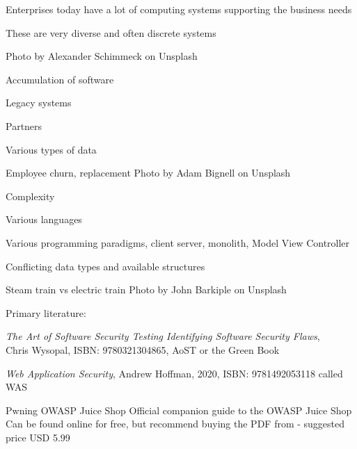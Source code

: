 \documentclass[Screen16to9,17pt]{foils}
\begin{document}
\begin{list2}
\item Enterprises today have a lot of computing systems supporting the business needs
\item These are very diverse and often discrete systems
\end{list2}

\hfill Photo by Alexander Schimmeck on Unsplash



\begin{list2}
\item Accumulation of software
\item Legacy systems
\item Partners
\item Various types of data
\item Employee churn, replacement \hfill Photo by Adam Bignell on Unsplash
\end{list2}




\begin{list2}
\item Complexity
\item Various languages
\item Various programming paradigms, client server, monolith, Model View Controller
\item Conflicting data types and available structures
\item Steam train vs electric train \hfill Photo by John Barkiple on Unsplash

\end{list2}



Primary literature:
\begin{list2}
\item \emph{The Art of Software Security Testing Identifying Software Security Flaws},\\
Chris Wysopal, ISBN: 9780321304865, AoST or the Green Book
\item \emph{Web Application Security}, Andrew Hoffman, 2020, ISBN: 9781492053118 called WAS
\item Pwning OWASP Juice Shop Official companion guide to the OWASP Juice Shop
Can be found online for free, but recommend buying the PDF from  - suggested price USD 5.99


\end{list2}
\end{document}
